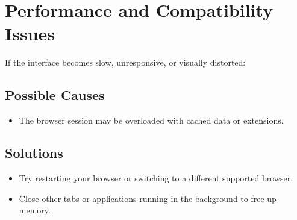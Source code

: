 \section{Performance and Compatibility Issues}
If the interface becomes slow, unresponsive, or visually distorted:

\subsection{Possible Causes}
\begin{itemize}
	\item The browser session may be overloaded with cached data or extensions.
	
\end{itemize}

\subsection{Solutions}
\begin{itemize}
	\item Try restarting your browser or switching to a different supported browser.
	\item Close other tabs or applications running in the background to free up memory.
\end{itemize}






